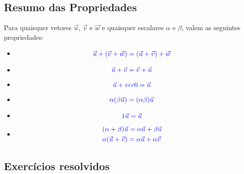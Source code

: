     
\subsection{Resumo das Propriedades}

Para quaisquer vetores $\vec{u}$, $\vec{v}$ e $\vec{w}$ e quaisquer escalares $\alpha$ e $\beta$, valem as seguintes propriedades:
\begin{itemize}
\item {}
\begin{equation}\color{blue}\vec{u} + (\vec{v} + \vec{w}) = (\vec{u} + \vec{v}) + \vec{w}
\end{equation}

\item {}
\begin{equation}\color{blue}\vec{u} + \vec{v} = \vec{v} + \vec{u}
\end{equation}

\item {}
\begin{equation}\color{blue}\vec{u} + vec{0} = \vec{u}
\end{equation}

\item {}
\begin{equation}\color{blue}\alpha(\beta\vec{u}) = (\alpha\beta)\vec{u}
\end{equation}

\item {}
\begin{equation}\color{blue}1\vec{u} = \vec{u}
\end{equation}

\item {}
\begin{align}
  &\color{blue}(\alpha+\beta)\vec{u} = \alpha\vec{u} + \beta\vec{u}\\
  &\color{blue}\alpha(\vec{u} + \vec{v}) = \alpha\vec{u} + \alpha\vec{v}
\end{align}

\end{itemize}

\subsection*{Exercícios resolvidos}

